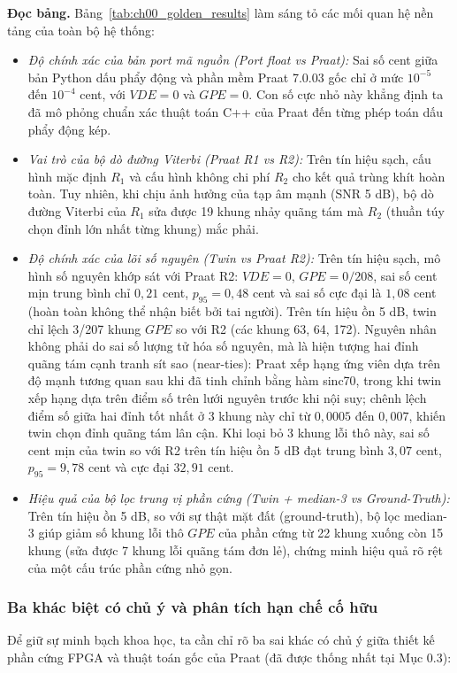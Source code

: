 \textbf{Đọc bảng.} Bảng~\ref{tab:ch00_golden_results} làm sáng tỏ các mối quan hệ nền tảng của toàn bộ hệ thống:
\begin{itemize}[leftmargin=1.5em, itemsep=2pt]
    \item \emph{Độ chính xác của bản port mã nguồn (Port float vs Praat):} Sai số cent giữa bản Python dấu phẩy động và phần mềm Praat 7.0.03 gốc chỉ ở mức $10^{-5}$ đến $10^{-4}$ cent, với $VDE = 0$ và $GPE = 0$. Con số cực nhỏ này khẳng định ta đã mô phỏng chuẩn xác thuật toán C++ của Praat đến từng phép toán dấu phẩy động kép.
    \item \emph{Vai trò của bộ dò đường Viterbi (Praat R1 vs R2):} Trên tín hiệu sạch, cấu hình mặc định $R_1$ và cấu hình không chi phí $R_2$ cho kết quả trùng khít hoàn toàn. Tuy nhiên, khi chịu ảnh hưởng của tạp âm mạnh (SNR 5 dB), bộ dò đường Viterbi của $R_1$ sửa được 19 khung nhảy quãng tám mà $R_2$ (thuần túy chọn đỉnh lớn nhất từng khung) mắc phải.
    \item \emph{Độ chính xác của lõi số nguyên (Twin vs Praat R2):} Trên tín hiệu sạch, mô hình số nguyên khớp sát với Praat R2: $VDE = 0$, $GPE = 0/208$, sai số cent mịn trung bình chỉ $0{,}21$ cent, $p_{95} = 0{,}48$ cent và sai số cực đại là $1{,}08$ cent (hoàn toàn không thể nhận biết bởi tai người). Trên tín hiệu ồn 5 dB, twin chỉ lệch 3/207 khung $GPE$ so với R2 (các khung 63, 64, 172). Nguyên nhân không phải do sai số lượng tử hóa số nguyên, mà là hiện tượng hai đỉnh quãng tám cạnh tranh sít sao (near-ties): Praat xếp hạng ứng viên dựa trên độ mạnh tương quan sau khi đã tinh chỉnh bằng hàm sinc70, trong khi twin xếp hạng dựa trên điểm số trên lưới nguyên trước khi nội suy; chênh lệch điểm số giữa hai đỉnh tốt nhất ở 3 khung này chỉ từ $0{,}0005$ đến $0{,}007$, khiến twin chọn đỉnh quãng tám lân cận. Khi loại bỏ 3 khung lỗi thô này, sai số cent mịn của twin so với R2 trên tín hiệu ồn 5 dB đạt trung bình $3{,}07$ cent, $p_{95} = 9{,}78$ cent và cực đại $32{,}91$ cent.
    \item \emph{Hiệu quả của bộ lọc trung vị phần cứng (Twin + median-3 vs Ground-Truth):} Trên tín hiệu ồn 5 dB, so với sự thật mặt đất (ground-truth), bộ lọc median-3 giúp giảm số khung lỗi thô $GPE$ của phần cứng từ 22 khung xuống còn 15 khung (sửa được 7 khung lỗi quãng tám đơn lẻ), chứng minh hiệu quả rõ rệt của một cấu trúc phần cứng nhỏ gọn.
\end{itemize}

\subsubsection*{Ba khác biệt có chủ ý và phân tích hạn chế cố hữu}
Để giữ sự minh bạch khoa học, ta cần chỉ rõ ba sai khác có chủ ý giữa thiết kế phần cứng FPGA và thuật toán gốc của Praat (đã được thống nhất tại Mục 0.3):

